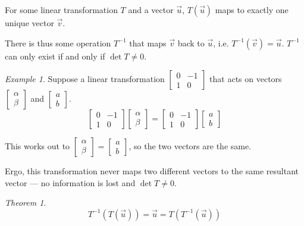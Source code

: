 \documentclass[a4paper]{article}
\theoremstyle{remark}
\newtheorem{example}{Example}
\theoremstyle{theorem}
\newtheorem{theorem}{Theorem}
\begin{document}
For some linear transformation $T$ and a vector $\vec{u}$, $T(\vec{u})$ maps to exactly one unique vector $\vec{v}$.

There is thus some operation $T^{-1}$ that maps $\vec{v}$ back to $\vec{u}$, i.e. $T^{-1}(\vec{v}) = \vec{u}$.
$T^{-1}$ can only exist if and only if $\det{T} \neq 0$.

\begin{example}
	Suppose a linear transformation $\begin{bmatrix} 0 & -1 \\ 1 & 0\end{bmatrix}$ that acts on vectors $\begin{bmatrix} \alpha \\ \beta\end{bmatrix}$ and $\begin{bmatrix} a \\ b \end{bmatrix}$.
	\begin{equation}
		\begin{bmatrix} 0 & -1 \\ 1 & 0\end{bmatrix}
		\begin{bmatrix} \alpha \\ \beta \end{bmatrix}
		=
		\begin{bmatrix} 0 & -1 \\ 1 & 0\end{bmatrix}
		\begin{bmatrix} a \\ b \end{bmatrix}
	\end{equation}
	
	This works out to $\begin{bmatrix} \alpha \\ \beta\end{bmatrix} = \begin{bmatrix} a \\ b\end{bmatrix}$, so the two vectors are the same.

	Ergo, this transformation never maps two different vectors to the same resultant vector --- no information is lost and $\det{T} \neq 0$.
\end{example}

\begin{theorem}
	\begin{equation}
		T^{-1}(T(\vec{u})) = \vec{u} = T(T^{-1}(\vec{u}))
	\end{equation}
\end{theorem}
\end{document}

